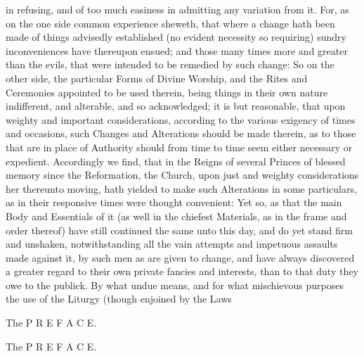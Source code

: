 in refusing, and of too much easiness in admitting any variation from it. For, as on the one side common experience sheweth, that where a change hath been made of things advisedly established (no evident necessity so requiring) sundry inconveniences have thereupon ensued; and those many times more and greater than the evils, that were intended to be remedied by such change: So on the other side, the particular Forms of Divine Worship, and the Rites and Ceremonies appointed to be used therein, being things in their own nature indifferent, and alterable, and so acknowledged; it is but reasonable, that upon weighty and important considerations, according to the various exigency of times and occasions, such Changes and Alterations should be made therein, as to those that are in place of Authority should from time to time seem either necessary or expedient. Accordingly we find, that in the Reigns of several Princes of blessed memory since the Reformation, the Church, upon just and weighty considerations her thereunto moving, hath yielded to make such Alterations in some particulars, as in their responsive times were thought convenient: Yet so, as that the main Body and Essentials of it (as well in the chiefest Materials, as in the frame and order thereof) have still continued the same unto this day, and do yet stand firm and unshaken, notwithstanding all the vain attempts and impetuous assaults made against it, by such men as are given to change, and have always discovered a greater regard to their own private fancies and interests, than to that duty they owe to the publick. By what undue means, and for what mischievous purposes the use of the Liturgy (though enjoined by the Laws

The P R E F A C E.

The P R E F A C E.

